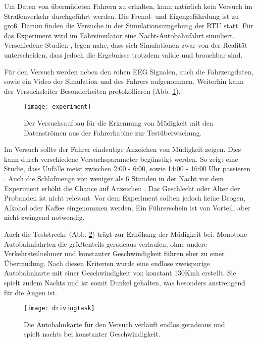 \label{chap:data}
Um Daten von übermüdeten Fahrern zu erhalten, kann natürlich kein Versuch im Straßenverkehr durchgeführt werden. Die Fremd- und Eigengefährdung ist zu groß. Darum finden die Versuche in der Simulationsumgebung der \acl{RTU} statt. Für das Experiment wird im Fahrsimulator eine Nacht-Autobahnfahrt simuliert. Verschiedene Studien \cite{Engstrom_2322937}, \cite{Horne_1757738} legen nahe, dass sich Simulationen zwar von der Realität unterscheiden, dass jedoch die Ergebnisse trotzdem valide und brauchbar sind.

Für den Versuch werden neben den rohen EEG Signalen, auch die Fahrzeugdaten, sowie ein Video der Simulation und des Fahrers aufgenommen. Weiterhin kann der Versuchsleiter Besonderheiten protokollieren (Abb. \ref{fig:experiment}).

\begin{figure}[h] 
  \begin{center}
    \texttt{[image: experiment]}
    \caption[Versuchsaufbau Experiment]{Der Versuchsaufbau für die Erkennung von Müdigkeit mit den Datenströmen aus der Fahrerkabine zur Testüberwachung. \label{fig:experiment}}
  \end{center}
\end{figure}

Im Versuch sollte der Fahrer eindeutige Anzeichen von Müdigkeit zeigen. Dies kann durch verschiedene Versuchsparameter begünstigt werden. So zeigt eine Studie, dass Unfälle meist zwischen 2:00 - 6:00, sowie 14:00 - 16:00 Uhr passieren \cite{Horne_1757738}. Auch die Schlafmenge von weniger als 6 Stunden in der Nacht vor dem Experiment erhöht die Chance auf Anzeichen \cite{Engstrom_2322937}. Das Geschlecht oder Alter der Probanden ist nicht relevant. Vor dem Experiment sollten jedoch keine Drogen, Alkohol oder Kaffee eingenommen werden. Ein Führerschein ist von Vorteil, aber nicht zwingend notwendig.

Auch die Teststrecke (Abb. \ref{fig:drivingtask}) trägt zur Erhöhung der Müdigkeit bei. Monotone Autobahnfahrten die größtenteils geradeaus verlaufen, ohne andere Verkehrsteilnehmer und konstanter Geschwindigkeit führen eher zu einer Übermüdung. Nach diesen Kriterien wurde eine endlose zweispurige Autobahnkarte mit einer Geschwindigkeit von konstant 130Kmh erstellt. Sie spielt zudem Nachts und ist somit Dunkel gehalten, was besonders anstrengend für die Augen ist.

\begin{figure}[h] 
  \begin{center}
    \texttt{[image: drivingtask]}
    \caption[Driving Task Screenshot]{Die Autobahnkarte für den Versuch verläuft endlos geradeaus und spielt nachts bei konstanter Geschwindigkeit. \label{fig:drivingtask}}
  \end{center}
\end{figure}

